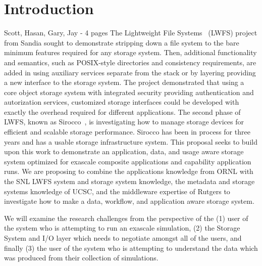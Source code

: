 \section*{Introduction} {\color{red} Scott, Hasan, Gary, Jay - 4 pages}
\label{sec:introduction}
The Lightweight File Systems~\cite{lwfs} (LWFS) project from Sandia sought to
demonstrate stripping down a file system to the bare minimum features required
for any storage system. Then, additional functionality and semantics, such as
POSIX-style directories and consistency requirements, are added in using
auxiliary services separate from the stack or by layering providing a new
interface to the storage system. The project demonstrated that using a core
object storage system with integrated security providing authentication and
autorization services, customized storage interfaces could be developed with
exactly the overhead required for different applications. The second phase of
LWFS, known as Sirocco~\cite{sirocco}, is investigating how to manage storage
devices for efficient and scalable storage performance.  Sirocco has been in
process for three years and has a usable storage infrastructure system. This
proposal seeks to build upon this work to demonstrate an application, data, and
usage aware storage system optimized for exascale composite applications and
capability application runs. We are proposing to combine the applications
knowledge from ORNL with the SNL LWFS system and storage system knowledge, the
metadata and storage systems knowledge of UCSC, and the middleware expertise of
Rutgers to investigate how to make a data, workflow, and application aware
storage system.

We will examine the research challenges from the perspective of the
%
(1) user of the system who is attempting to run an exascale simulation,
%
(2) the Storage System and I/O layer which needs to negotiate amongst all of
the users, and finally
%
(3) the user of the system who is attempting to understand the data which
was produced from their collection of simulations.

